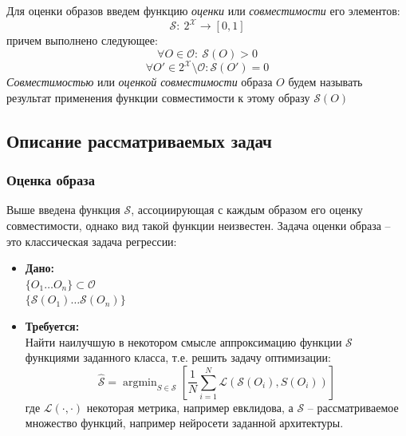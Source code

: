 \documentclass[a4paper,12pt]{article}
\DeclareMathOperator*{\argmin}{argmin}
\begin{document}
			Для оценки образов введем функцию \textit{оценки} или \textit{совместимости} его элементов: 
			$$\mathcal{S}:~2^\mathcal{X}\longrightarrow [0,1]$$
			 причем выполнено следующее:
			$$\forall O \in \mathcal{O}:~\mathcal{S}(O) > 0$$
			$$\forall O' \in 2^\mathcal{X} \setminus \mathcal{O}: \mathcal{S}(O') =0$$
			\textit{Совместимостью} или \textit{оценкой совместимости} образа $O$ будем называть результат применения функции совместимости к этому образу $\mathcal{S}(O)$
			
		\subsection{Описание рассматриваемых задач}
			\subsubsection{Оценка образа}
				Выше введена функция $\mathcal{S}$, ассоциирующая с каждым образом его оценку совместимости, однако вид такой функции неизвестен. Задача оценки образа -- это классическая задача регрессии:\\
				\begin{itemize}
					\item \textbf{Дано:}\\
						$\{O_1\dots O_n\}\subset \mathcal{O}$\\
						$\{\mathcal{S}(O_1)\dots\mathcal{S}(O_n)\}$
					\item \textbf{Требуется:}\\
					Найти наилучшую в некотором смысле аппроксимацию функции $\mathcal{S}$ функциями заданного класса, т.е. решить задачу оптимизации:\\
					$$\hat{\mathcal{S}}= \argmin_{S\in\mathscr{S}}\left[\frac{1}{N} \sum\limits_{i=1}^N\mathcal{L}(\mathcal{S}(O_i), S(O_i))\right]$$
					где $\mathcal{L}(\cdot, \cdot)$ некоторая метрика, например евклидова, а $\mathscr{S}$ -- рассматриваемое множество функций, например нейросети заданной архитектуры.
				\end{itemize}
			
\end{document}
